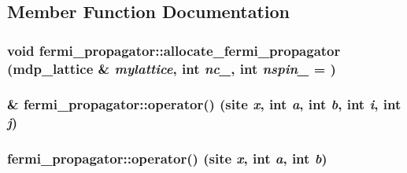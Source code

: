 \subsection{Member Function Documentation}
\hypertarget{classfermi__propagator_a8ee1c8631f83f4e4876eff6253c41954}{
\subsubsection[{allocate\_\-fermi\_\-propagator}]{\setlength{\rightskip}{0pt plus 5cm}void fermi\_\-propagator::allocate\_\-fermi\_\-propagator ({\bf mdp\_\-lattice} \& {\em mylattice}, \/  int {\em nc\_\-}, \/  int {\em nspin\_\-} = {})}}
\label{classfermi__propagator_a8ee1c8631f83f4e4876eff6253c41954}
\hypertarget{classfermi__propagator_a8552fbd45ff1fd6b450353713dc21bcd}{
\subsubsection[{operator()}]{\& fermi\_\-propagator::operator() (site {\em x}, \/  int {\em a}, \/  int {\em b}, \/  int {\em i}, \/  int {\em j})}}
\label{classfermi__propagator_a8552fbd45ff1fd6b450353713dc21bcd}
\hypertarget{classfermi__propagator_afb016830eaa4959a21901d5895adb4bc}{
\subsubsection[{operator()}]{ fermi\_\-propagator::operator() (site {\em x}, \/  int {\em a}, \/  int {\em b})}}
\label{classfermi__propagator_afb016830eaa4959a21901d5895adb4bc}


